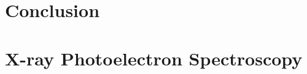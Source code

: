 \documentclass[xcolor=table, t, 9pt, head=0cm]{beamer}
\begin{document}
    \section{Conclusion}
    
    

\appendix
    
    
    
    

    
    

    
    

    \section{X-ray Photoelectron Spectroscopy}
    
    
    
    

    
\end{document}
